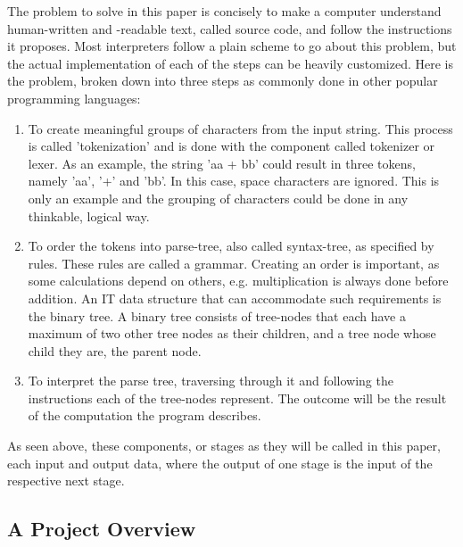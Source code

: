 \documentclass[12pt,a4paper]{article}
\newcommand{\pagelabel}[1]{\phantomsection\label{#1}}
\begin{document}
The problem to solve in this paper is concisely to make a computer understand
human-written and -readable text, called source code, and follow the instructions
it proposes.
Most interpreters follow a plain scheme to go about this problem, but the
actual implementation of each of the steps can be heavily customized.
Here is the problem, broken down into three steps as commonly done in other
popular programming languages:
\begin{enumerate}\pagelabel{simple interpreter}
    \item To create meaningful groups of characters from the input string. This
        process is called 'tokenization' and is done with the component called
        tokenizer or lexer. As an example, the string 'aa + bb' could result
        in three tokens, namely 'aa', '+' and 'bb'. In this case, space characters
        are ignored. 
        This is only an example and the grouping of characters could be done 
        in any thinkable, logical way.
    \item To order the tokens into parse-tree, also called syntax-tree, as
        specified by rules. These rules are called a grammar.
        Creating an order is important, as some calculations depend on others, e.g. multiplication
        is always done before addition. An IT data structure that can accommodate
        such requirements is the binary tree. A binary tree consists of tree-nodes
        that each have a maximum of two other tree nodes as their children, and
        a tree node whose child they are, the parent node.
    \item To interpret the parse tree, traversing through it and following the
        instructions each of the tree-nodes represent. The outcome
        will be the result of the computation the program describes.
\end{enumerate}

As seen above, these components, or stages as they will be called in this paper,
each input and output data, where the output of one stage is the input of the
respective next stage.

\subsection{A Project Overview}
\end{document}
